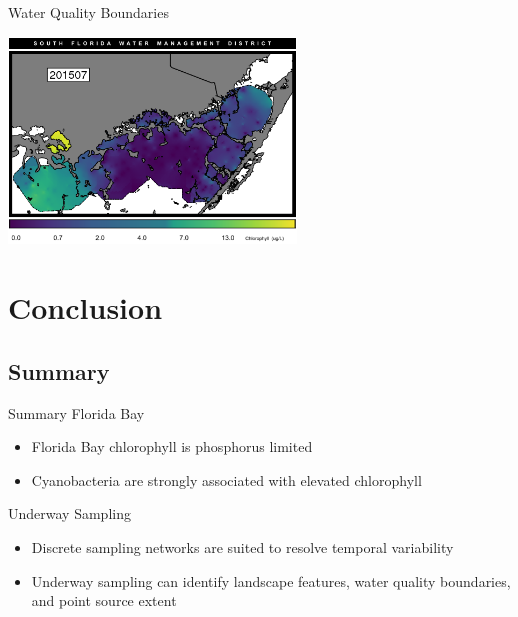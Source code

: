 \documentclass[compress,noflama,nosectionpages]{beamer}
\begin{document}
		\begin{frame}{Water Quality Boundaries}
			\begin{center}
				\includegraphics[height=5.5cm,keepaspectratio=true,trim= 1mm 0mm 1mm 10mm,clip=TRUE]{figures/201507_chl.png}\\
			\end{center}
		\end{frame}

\section{Conclusion}
\subsection{Summary}

\begin{frame}{Summary}
\large
Florida Bay
\begin{itemize}
\item{Florida Bay chlorophyll is phosphorus limited}
\vspace{6pt}
\item{Cyanobacteria are strongly associated with elevated chlorophyll}
\end{itemize}

Underway Sampling
\begin{itemize}
\item{Discrete sampling networks are suited to resolve temporal variability}
\vspace{6pt}
\item{Underway sampling can identify landscape features, water quality boundaries, and point source extent}
\end{itemize}

\end{frame}
\end{document}
